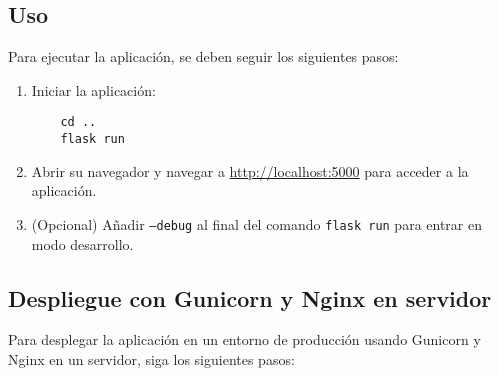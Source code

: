 \subsection{Uso}

Para ejecutar la aplicación, se deben seguir los siguientes pasos:

\begin{enumerate}
    \item Iniciar la aplicación:
    \begin{verbatim}
    cd ..
    flask run
    \end{verbatim}

    \item Abrir su navegador y navegar a \url{http://localhost:5000} para acceder a la aplicación.

    \item (Opcional) Añadir \texttt{--debug} al final del comando \texttt{flask run} para entrar en modo desarrollo.
\end{enumerate}

\subsection{Despliegue con Gunicorn y Nginx en servidor}

Para desplegar la aplicación en un entorno de producción usando Gunicorn y Nginx en un servidor, siga los siguientes pasos:

